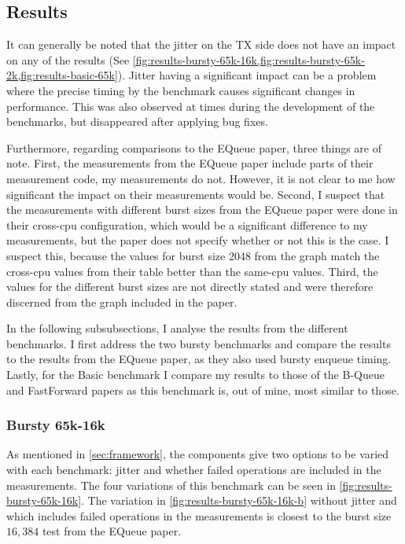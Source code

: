 \subsection{Results}
It can generally be noted that the jitter on the TX side does not have an impact on any of the results
(See \cref{fig:results-bursty-65k-16k,fig:results-bursty-65k-2k,fig:results-basic-65k}).
Jitter having a significant impact can be a problem where the precise timing by the benchmark causes
significant changes in performance.
This was also observed at times during the development of the benchmarks, but disappeared after applying bug fixes.

Furthermore, regarding comparisons to the EQueue paper, three things are of note.
First, the measurements from the EQueue paper include parts of their measurement code, my measurements do
not\cite{EQueueGithub}.
However, it is not clear to me how significant the impact on their measurements would be.
Second, I suspect that the measurements with different burst sizes from the EQueue paper were done in their
cross-cpu configuration,
which would be a significant difference to my measurements, but the paper does not specify whether or not
this is the case.
I suspect this, because the values for burst size 2048 from the graph match the cross-cpu values from their
table better than the same-cpu values.
Third, the values for the different burst sizes are not directly stated and were therefore discerned from the
graph included in the paper.

In the following subsubsections, I analyse the results from the different benchmarks.
I first address the two bursty benchmarks and compare the results to the results from the EQueue paper, as
they also used bursty enqueue timing.
Lastly, for the Basic benchmark I compare my results to those of the B-Queue and FastForward papers as this
benchmark is, out of mine, most similar to those.





\subsubsection{Bursty 65k-16k}
As mentioned in \autoref{sec:framework}, the components give two options to be varied with each benchmark:
jitter and whether failed operations are included in the measurements.
The four variations of this benchmark can be seen in \autoref{fig:results-bursty-65k-16k}.
The variation in \autoref{fig:results-bursty-65k-16k-b} without jitter and which includes failed operations
in the measurements is closest to the burst size $16,384$ test from the EQueue paper\cite{EQueue}.

